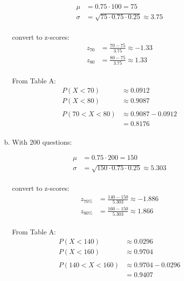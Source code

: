 \documentclass[letterpaper, landscape]{exam}
\begin{document}
\begin{description}
\begin{enumerate}[(a)]
            \begin{align*}
              \mu    & = 0.75 \cdot 100 = 75 \\
              \sigma & = \sqrt{75 \cdot 0.75 \cdot 0.25} \approx 3.75 \\
            \end{align*}

            convert to z-scores:
            \begin{align*}
              z_{70} &= \frac{70 - 75}{3.75} \approx -1.33 \\
              z_{80} &= \frac{80 - 75}{3.75} \approx 1.33 \\
            \end{align*}

            From Table A:
            \begin{align*}
              P(X < 70) & \approx 0.0912 \\
              P(X < 80) & \approx 0.9087 \\
              \\
              P(70 < X < 80) & \approx 0.9087 - 0.0912 \\
                             & = 0.8176 \\
            \end{align*}

          \item
            With 200 questions:

            \begin{align*}
              \mu    & = 0.75 \cdot 200 = 150 \\
              \sigma & = \sqrt{150 \cdot 0.75 \cdot 0.25} \approx 5.303 \\
            \end{align*}

            convert to z-scores:
            \begin{align*}
              z_{70\%} &= \frac{140 - 150}{5.303} \approx -1.886 \\
              z_{80\%} &= \frac{160 - 150}{5.303} \approx 1.866 \\
            \end{align*}

            From Table A:
            \begin{align*}
              P(X < 140) & \approx 0.0296 \\
              P(X < 160) & \approx 0.9704 \\
              \\
              P(140 < X < 160) & \approx 0.9704 - 0.0296 \\
                               & = 0.9407 \\
            \end{align*}
        

\end{enumerate}
\end{description}
\end{document}
